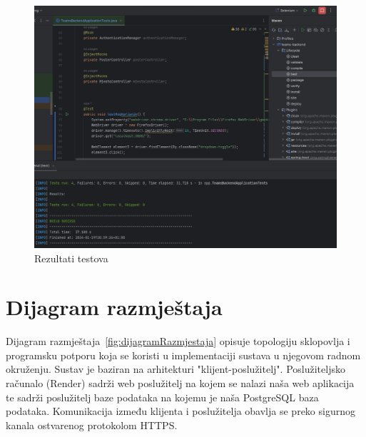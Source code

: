 			\begin{figure}[H]
				\includegraphics[width=\textwidth]{slike/SeleniumAll.png} %
				\caption{Rezultati testova}
				\label{fig:SeleniumAll} %
			\end{figure}
			
			\eject 
		
		
		\section{Dijagram razmještaja}
			
			Dijagram razmještaja~\ref{fig:dijagramRazmjestaja} opisuje topologiju sklopovlja i programsku potporu koja se koristi u implementaciji sustava u njegovom radnom okruženju. Sustav je baziran na arhitekturi "klijent-poslužitelj". Poslužiteljsko računalo (Render) sadrži web poslužitelj na kojem se nalazi naša web aplikacija te sadrži poslužitelj baze podataka na kojemu je naša PostgreSQL baza podataka. Komunikacija između klijenta i poslužitelja obavlja se preko sigurnog kanala ostvarenog protokolom HTTPS.
			
